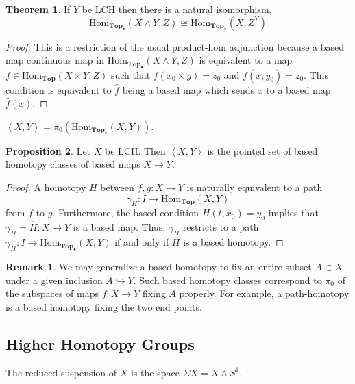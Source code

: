 \documentclass[12pt]{extarticle}
\newcommand{\catHom}[3]{\mathrm{Hom}_{#1}\left( #2, #3 \right)}
\newcommand{\Top}{\mathbf{Top}}
\newcommand{\pTop}{\mathbf{Top}_{\bullet}}
\theoremstyle{definition}
\newtheorem{theorem}{Theorem}[section]
\newtheorem{proposition}[theorem]{Proposition}
\newtheorem{remark}{Remark}
\newenvironment{definition}[1][Definition:]{\begin{trivlist}
\item[\hskip \labelsep {\bfseries #1}]}{\end{trivlist}}
\begin{document}
\begin{theorem}
If $Y$ be LCH then there is a natural isomorphism,
\[\catHom{\pTop}{X \wedge Y}{Z} \cong \catHom{\pTop}{X}{Z^Y} \]
\end{theorem}

\begin{proof}
This is a restriction of the usual product-hom adjunction because a based map continuous map in $\catHom{\pTop}{X \wedge Y}{Z}$ is equivalent to a map $f \in \catHom{\Top}{X \times Y}{Z}$ such that $f(x_0 \times y) = z_0$ and $f(x, y_0) = z_0$. This condition is equivalent to $\hat{f}$ being a based map which sends $x$ to a based map $\hat{f}(x)$.  
\end{proof}

\begin{definition}
$\left< X, Y \right> = \pi_0(\catHom{\pTop}{X}{Y})$.
\end{definition}

\begin{proposition}
Let $X$ be LCH. Then $\left< X, Y \right>$ is the pointed set of based homotopy classes of based maps $X \to Y$.  
\end{proposition}

\begin{proof}
A homotopy $H$ between $f, g : X \to Y$ is naturally equivalent to a path 
\[\gamma_H : I \to \catHom{\Top}{X}{Y}\]
from $f$ to $g$. Furthermore, the based condition $H(t, x_0) = y_0$ implies that $\gamma_H = \hat{H} : X \to Y$ is a based map. Thus, $\gamma_H$ restricts to a path $\gamma_H : I \to \catHom{\pTop}{X}{Y}$ if and only if $H$ is a based homotopy.    
\end{proof}

\begin{remark}
We may generalize a based homotopy to fix an entire subset $A \subset X$ under a given inclusion $A \hookrightarrow Y$. Such based homotopy classes correspond to $\pi_0$ of the subspaces of maps $f : X \to Y$ fixing $A$ properly. For example, a path-homotopy is a based homotopy fixing the two end points. 
\end{remark}

\subsection{Higher Homotopy Groups}


\begin{definition}
The reduced suspension of $X$ is the space $\Sigma X = X \wedge S^1$. 
\end{definition}
\end{document}
